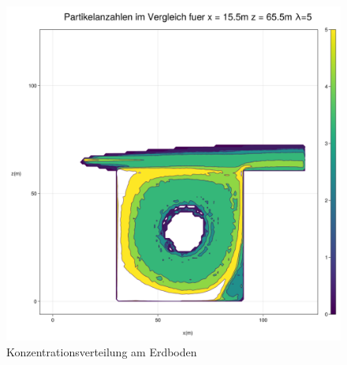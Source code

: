 \documentclass[ngerman]{scrartcl}
\begin{document}
\begin{figure}[H]
	\centering
	\includegraphics[scale=0.3]{Bilder/3_single_x = 15.5_5.png}
	\caption{Konzentrationsverteilung am Erdboden}
	\label{fig:my_label}
\end{figure}
\end{document}
